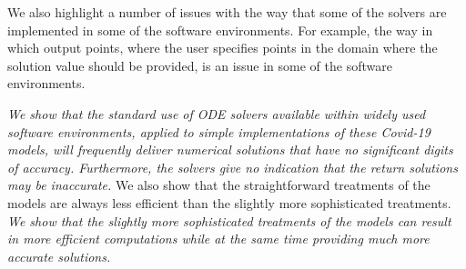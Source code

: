 \documentclass{article}
\begin{document}
We also highlight a number of issues with the way that some of the solvers are implemented
in some of the software environments. For example, the way in which output points, where 
the user specifies points in the domain where the solution value should be provided,
is an issue in some of the software environments. 

{\it We show that the standard use of ODE solvers available within  widely used software 
environments, applied to simple implementations of these Covid-19 models, will
frequently deliver numerical solutions that have no significant digits of accuracy.
Furthermore, the solvers give no indication that the return solutions
may be inaccurate.} We also show that the straightforward treatments of the models 
are always less efficient than the slightly more sophisticated treatments.
{\it We show that the slightly more sophisticated treatments of the models can 
result in more efficient computations while at the same time providing
much more accurate solutions.}









\appendix

\end{document}
